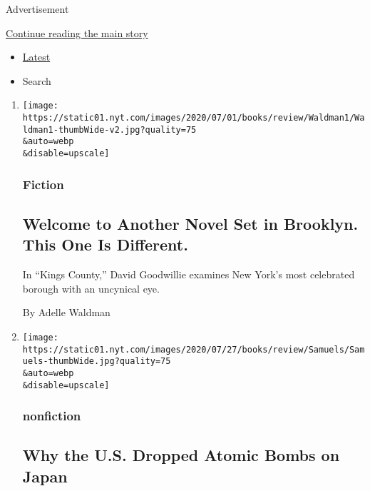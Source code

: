 Advertisement

\protect\hyperlink{after-mid1}{Continue reading the main story}

\begin{itemize}
\tightlist
\item
  \protect\hyperlink{stream-panel}{Latest}
\item
  Search
\end{itemize}

\begin{enumerate}
\def\labelenumi{\arabic{enumi}.}
\item
  \href{/2020/08/03/books/review/kings-county-david-goodwillie.html}{}

  \texttt{[image: https://static01.nyt.com/images/2020/07/01/books/review/Waldman1/Waldman1-thumbWide-v2.jpg?quality=75\\\&auto=webp\\\&disable=upscale]}

  \hypertarget{fiction-3}{%
  \subsubsection{Fiction}\label{fiction-3}}

  \hypertarget{welcome-to-another-novel-set-in-brooklyn-this-one-is-different}{%
  \subsection{Welcome to Another Novel Set in Brooklyn. This One Is
  Different.}\label{welcome-to-another-novel-set-in-brooklyn-this-one-is-different}}

  In ``Kings County,'' David Goodwillie examines New York's most
  celebrated borough with an uncynical eye.

  By Adelle Waldman
\item
  \href{/2020/08/03/books/review/unconditional-marc-gallicchio.html}{}

  \texttt{[image: https://static01.nyt.com/images/2020/07/27/books/review/Samuels/Samuels-thumbWide.jpg?quality=75\\\&auto=webp\\\&disable=upscale]}

  \hypertarget{nonfiction-5}{%
  \subsubsection{nonfiction}\label{nonfiction-5}}

  \hypertarget{why-the-us-dropped-atomic-bombs-on-japan}{%
  \subsection{Why the U.S. Dropped Atomic Bombs on
  Japan}\label{why-the-us-dropped-atomic-bombs-on-japan}}


\end{enumerate}
